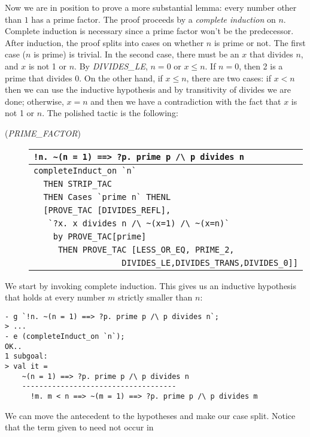 Now we are in position to prove a more substantial lemma: every number
other than $1$ has a prime factor. The proof proceeds by a {\it
complete induction\/} on $n$. Complete induction is
necessary since a prime factor won't be the predecessor. After
induction, the proof splits into cases on whether $n$ is prime or
not. The first case ($n$ is prime) is
trivial. In the second case, there must be an $x$ that divides $n$, and
$x$ is not 1 or $n$. By {\small\it DIVIDES\_LE}, $n=0$ or $x \leq n$. If
$n=0$, then 2 is a prime that divides 0. On the other hand, if $x \leq
n$, there are two cases: if $x < n$ then we can use the inductive
hypothesis and by transitivity of divides we are done; otherwise,
$x=n$ and then we have a contradiction with the fact that $x$ is not 1
or $n$.  The polished tactic is the following:
\begin{description}
\item [\small{({\it PRIME\_FACTOR\/})}]
\begin{tabular}[t]{l}
\verb+!n. ~(n = 1) ==> ?p. prime p /\ p divides n+ \\ \hline
\verb+completeInduct_on `n`+ \\
\verb+  THEN STRIP_TAC+ \\
\verb+  THEN Cases `prime n` THENL+ \\
\verb+  [PROVE_TAC [DIVIDES_REFL], + \\
\verb+   `?x. x divides n /\ ~(x=1) /\ ~(x=n)` + \\
\verb+    by PROVE_TAC[prime]+ \\
\verb+     THEN PROVE_TAC [LESS_OR_EQ, PRIME_2, +\\
\verb+                  DIVIDES_LE,DIVIDES_TRANS,DIVIDES_0]]+ \\
\end{tabular}
\end{description}
We start by invoking complete induction. This gives us an inductive
hypothesis that holds at every number $m$ strictly smaller than $n$:
\begin{session}\begin{verbatim}
- g `!n. ~(n = 1) ==> ?p. prime p /\ p divides n`;
> ...
- e (completeInduct_on `n`);
OK..
1 subgoal:
> val it =
    ~(n = 1) ==> ?p. prime p /\ p divides n
    ------------------------------------
      !m. m < n ==> ~(m = 1) ==> ?p. prime p /\ p divides m
\end{verbatim}\end{session}
We can move the antecedent to the hypotheses and make our case
split. Notice that the term given to  need not occur in
